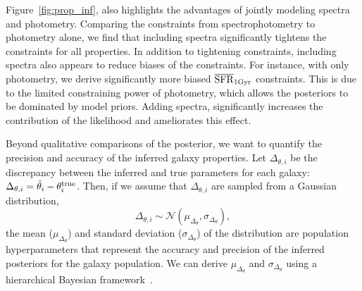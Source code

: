 Figure~\ref{fig:prop_inf}, also highlights the advantages of jointly modeling
spectra and photometry. 
Comparing the constraints from spectrophotometry to photometry alone, we find
that including spectra significantly tightens the constraints for all
properties. 
In addition to tightening constraints, including spectra also appears to reduce
biases of the constraints. 
For instance, with only photometry, we derive significantly more biased
$\overline{\rm SFR}_{\rm 1Gyr}$ constraints.
This is due to the limited constraining power of photometry, which allows the
posteriors to be dominated by model priors. 
Adding spectra, significantly increases the contribution of the likelihood and
ameliorates this effect. 

Beyond qualitative comparisons of the posterior, we want to quantify the
precision and accuracy of the inferred galaxy properties. 
Let $\Delta_{\theta,i}$ be the discrepancy between the inferred and true
parameters for each galaxy: 
$\Delta_{\theta,i} = \hat{\theta}_i - \theta^{\rm true}_i$.
Then, if we assume that $\Delta_{\theta,i}$ are sampled from a Gaussian
distribution,
\begin{equation} \label{eq:eta_gauss}
    \Delta_{\theta,i} \sim \mathcal{N}(\mu_{\Delta_{\theta}}, \sigma_{\Delta_{\theta}}),
\end{equation}
the mean ($\mu_{\Delta_{\theta}}$) and standard deviation
($\sigma_{\Delta_{\theta}}$) of the distribution are population hyperparameters
that represent the accuracy and precision of the inferred posteriors for the
galaxy population. 
We can derive $\mu_{\Delta_{\theta}}$ and $\sigma_{\Delta_{\theta}}$ using a
hierarchical Bayesian framework~\citep[\emph{e.g.}][]{hogg2010,
foreman-mackey2014, baronchelli2020}.

